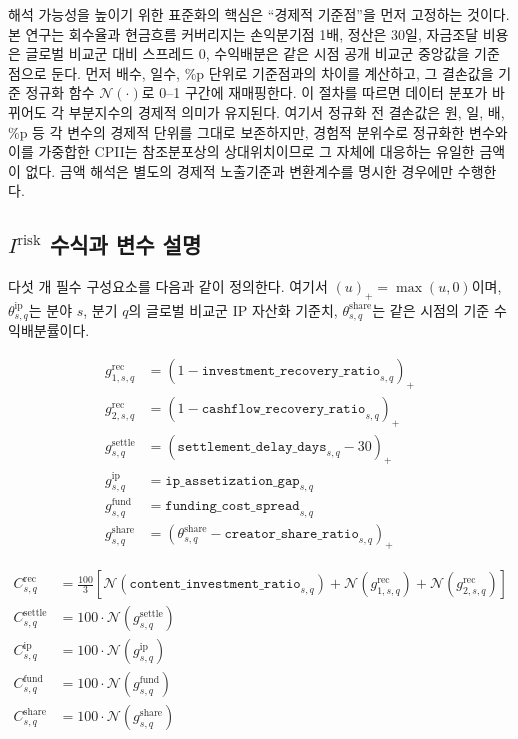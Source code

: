 \documentclass[11pt,a4paper]{report}
\begin{document}
해석 가능성을 높이기 위한 표준화의 핵심은 ``경제적 기준점''을 먼저 고정하는 것이다. 본 연구는 회수율과 현금흐름 커버리지는 손익분기점 1배, 정산은 30일, 자금조달 비용은 글로벌 비교군 대비 스프레드 0, 수익배분은 같은 시점 공개 비교군 중앙값을 기준점으로 둔다. 먼저 배수, 일수, \%p 단위로 기준점과의 차이를 계산하고, 그 결손값을 기준 정규화 함수 $\mathcal{N}(\cdot)$로 0--1 구간에 재매핑한다. 이 절차를 따르면 데이터 분포가 바뀌어도 각 부분지수의 경제적 의미가 유지된다. 여기서 정규화 전 결손값은 원, 일, 배, \%p 등 각 변수의 경제적 단위를 그대로 보존하지만, 경험적 분위수로 정규화한 변수와 이를 가중합한 CPII는 참조분포상의 상대위치이므로 그 자체에 대응하는 유일한 금액이 없다. 금액 해석은 별도의 경제적 노출기준과 변환계수를 명시한 경우에만 수행한다.

\subsection{\texorpdfstring{$I^{\mathrm{risk}}$ 수식과 변수 설명}{Irisk 수식과 변수 설명}}
다섯 개 필수 구성요소를 다음과 같이 정의한다. 여기서 $(u)_+ = \max(u,0)$이며, $\theta^{\mathrm{ip}}_{s,q}$는 분야 $s$, 분기 $q$의 글로벌 비교군 IP 자산화 기준치, $\theta^{\mathrm{share}}_{s,q}$는 같은 시점의 기준 수익배분률이다.

\begin{align}
g^{\mathrm{rec}}_{1,s,q} &= \left(1-\texttt{investment\_recovery\_ratio}_{s,q}\right)_+ \\
g^{\mathrm{rec}}_{2,s,q} &= \left(1-\texttt{cashflow\_recovery\_ratio}_{s,q}\right)_+ \\
g^{\mathrm{settle}}_{s,q} &= \left(\texttt{settlement\_delay\_days}_{s,q}-30\right)_+ \\
g^{\mathrm{ip}}_{s,q} &= \texttt{ip\_assetization\_gap}_{s,q} \\
g^{\mathrm{fund}}_{s,q} &= \texttt{funding\_cost\_spread}_{s,q} \\
g^{\mathrm{share}}_{s,q} &= \left(\theta^{\mathrm{share}}_{s,q}-\texttt{creator\_share\_ratio}_{s,q}\right)_+ \label{eq:irisk_shortfall_terms}
\end{align}

\begin{align}
C^{\mathrm{rec}}_{s,q} &= \frac{100}{3}\left[\mathcal{N}(\texttt{content\_investment\_ratio}_{s,q}) + \mathcal{N}(g^{\mathrm{rec}}_{1,s,q}) + \mathcal{N}(g^{\mathrm{rec}}_{2,s,q})\right] \\
C^{\mathrm{settle}}_{s,q} &= 100 \cdot \mathcal{N}(g^{\mathrm{settle}}_{s,q}) \\
C^{\mathrm{ip}}_{s,q} &= 100 \cdot \mathcal{N}(g^{\mathrm{ip}}_{s,q}) \\
C^{\mathrm{fund}}_{s,q} &= 100 \cdot \mathcal{N}(g^{\mathrm{fund}}_{s,q}) \\
C^{\mathrm{share}}_{s,q} &= 100 \cdot \mathcal{N}(g^{\mathrm{share}}_{s,q}) \label{eq:irisk_component_scores}
\end{align}
\end{document}
